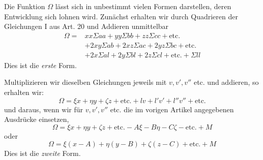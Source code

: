 Die Funktion \(\Omega\) lässt sich in unbestimmt vielen Formen darstellen, deren Entwicklung sich lohnen wird. Zunächst erhalten wir durch Quadrieren der Gleichungen I aus Art. 20 und Addieren unmittelbar
\[
\begin{aligned}
\Omega={}&xx\Sigma aa+yy\Sigma bb+zz\Sigma cc+\text{etc.}\\
&+2xy\Sigma ab+2xz\Sigma ac+2yz\Sigma bc+\text{etc.}\\
&+2x\Sigma al+2y\Sigma bl+2z\Sigma cl+\text{etc.}+\Sigma ll
\end{aligned}
\]
Dies ist die \textit{erste} Form.

Multiplizieren wir dieselben Gleichungen jeweils mit \(v,v',v''\) etc. und addieren, so erhalten wir:
\[
\Omega=\xi x+\eta y+\zeta z+\text{etc.}+lv+l'v'+l''v''+\text{etc.}
\]
und daraus, wenn wir für \(v,v',v''\) etc. die im vorigen Artikel angegebenen Ausdrücke einsetzen,
\[
\Omega=\xi x+\eta y+\zeta z+\text{etc.}-A\xi-B\eta-C\zeta-\text{etc.}+M
\]
oder
\[
\Omega=\xi(x-A)+\eta(y-B)+\zeta(z-C)+\text{etc.}+M
\]
Dies ist die \textit{zweite} Form.

